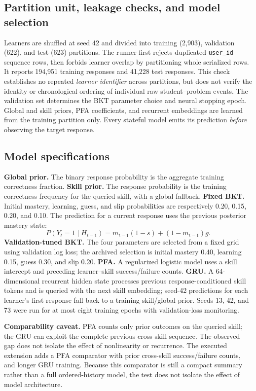 \documentclass[11pt,a4paper]{article}
\begin{document}
\subsection{Partition unit, leakage checks, and model selection}
Learners are shuffled at seed 42 and divided into training (2,903), validation (622), and test (623) partitions. The runner first rejects duplicated \texttt{user\_id} sequence rows, then forbids learner overlap by partitioning whole serialized rows. It reports 194,951 training responses and 41,228 test responses. This check establishes no repeated \emph{learner identifier} across partitions, but does not verify the identity or chronological ordering of individual raw student--problem events. The validation set determines the BKT parameter choice and neural stopping epoch. Global and skill priors, PFA coefficients, and recurrent embeddings are learned from the training partition only. Every stateful model emits its prediction \emph{before} observing the target response.

\subsection{Model specifications}
\textbf{Global prior.} The binary response probability is the aggregate training correctness fraction. \textbf{Skill prior.} The response probability is the training correctness frequency for the queried skill, with a global fallback. \textbf{Fixed BKT.} Initial mastery, learning, guess, and slip probabilities are respectively 0.20, 0.15, 0.20, and 0.10. The prediction for a current response uses the previous posterior mastery state:
\begin{equation}
P(Y_t=1\mid H_{t-1})=m_{t-1}(1-s)+(1-m_{t-1})g.
\end{equation}
\textbf{Validation-tuned BKT.} The four parameters are selected from a fixed grid using validation log loss; the archived selection is initial mastery 0.40, learning 0.15, guess 0.30, and slip 0.20. \textbf{PFA.} A regularized logistic model uses a skill intercept and preceding learner--skill success/failure counts. \textbf{GRU.} A 64-dimensional recurrent hidden state processes previous response-conditioned skill tokens and is queried with the next skill embedding; seed-42 predictions for each learner's first response fall back to a training skill/global prior. Seeds 13, 42, and 73 were run for at most eight training epochs with validation-loss monitoring.

\textbf{Comparability caveat.} PFA counts only prior outcomes on the queried skill; the GRU can exploit the complete previous cross-skill sequence. The observed gap does not isolate the effect of nonlinearity or recurrence. The executed extension adds a PFA comparator with prior cross-skill success/failure counts, and longer GRU training. Because this comparator is still a compact summary rather than a full ordered-history model, the test does not isolate the effect of model architecture.
\end{document}
